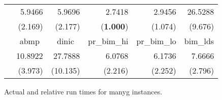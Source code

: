 \documentclass{article}
\begin{document}
\begin{figure}[ht]
\begin{center}
\begin{scriptsize}
\begin{tabular}{||c|r|r|r|r|r||}
    &   5.9466  &   5.9696  &   2.7418  &   2.9456  &   26.5288 \\
    &   (2.169) &   (2.177) &   ({\bf 1.000})   &   (1.074) &   (9.676) \\  \cline{2-6}
    &   \multicolumn{1}{|c|}{{\sf abmp}}    &   \multicolumn{1}{|c|}{{\sf dinic}}   &   \multicolumn{1}{|c|}{{\sf pr\_bim\_hi}} &   \multicolumn{1}{|c|}{{\sf pr\_bim\_lo}} &   \multicolumn{1}{|c||}{{\sf bim\_lds}}   \\  \cline{2-6}
    &   10.8922 &   27.7888 &   6.0768  &   6.1736  &   7.6666  \\
    &   (3.973) &   (10.135)    &   (2.216) &   (2.252) &   (2.796) \\  \hline
\hline
\end{tabular}
\end{scriptsize}
\caption{\label{Figure:manygscaling} Actual and relative run times for {\sf manyg} instances.}
\end{center}
\end{figure}
\end{document}
